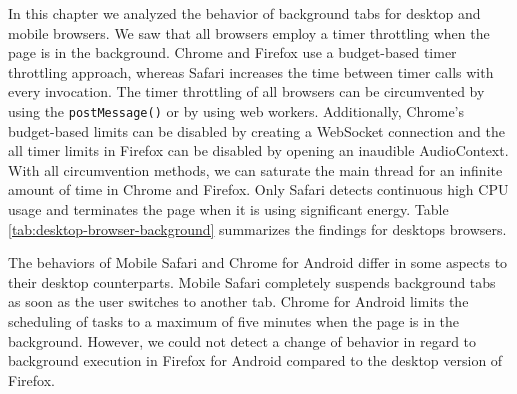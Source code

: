 \documentclass[
	ruledheaders=section,%
	class=report,%
	thesis={type=bachelor},%
	accentcolor=9c,%
	custommargins=true,%
	marginpar=false,%
	parskip=half-,%
	fontsize=11pt,%
]{tudapub}
\begin{document}
  In this chapter we analyzed the behavior of background tabs for desktop and mobile browsers. We saw that all browsers employ a timer throttling when the page is in the background. Chrome and Firefox use a budget-based timer throttling approach, whereas Safari increases the time between timer calls with every invocation. The timer throttling of all browsers can be circumvented by using the \texttt{postMessage()} or by using web workers. Additionally, Chrome's budget-based limits can be disabled by creating a WebSocket connection and the all timer limits in Firefox can be disabled by opening an inaudible AudioContext. With all circumvention methods, we can saturate the main thread for an infinite amount of time in Chrome and Firefox. Only Safari detects continuous high CPU usage and terminates the page when it is using significant energy. Table \ref{tab:desktop-browser-background} summarizes the findings for desktops browsers.

    The behaviors of Mobile Safari and Chrome for Android differ in some aspects to their desktop counterparts. Mobile Safari completely suspends background tabs as soon as the user switches to another tab. Chrome for Android limits the scheduling of tasks to a maximum of five minutes when the page is in the background. However, we could not detect a change of behavior in regard to background execution in Firefox for Android compared to the desktop version of Firefox.
\end{document}
